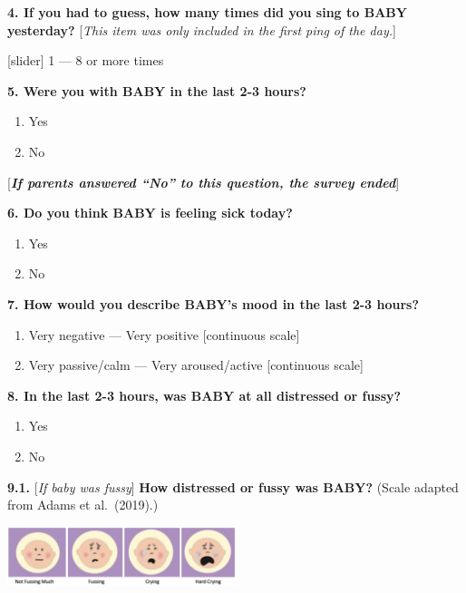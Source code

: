 \documentclass[
]{article}
\providecommand{\tightlist}{%
  \setlength{\itemsep}{0pt}\setlength{\parskip}{0pt}}
\begin{document}
\textbf{4. If you had to guess, how many times did you sing to BABY
yesterday?} {[}\emph{This item was only included in the first ping of
the day.}{]}

{[}slider{]} 1 --- 8 or more times

\textbf{5. Were you with BABY in the last 2-3 hours?}

\begin{enumerate}
\def\labelenumi{\alph{enumi}.}
\tightlist
\item
  Yes
\item
  No
\end{enumerate}

{[}\textbf{\emph{If parents answered ``No'' to this question, the survey
ended}}{]}

\textbf{6. Do you think BABY is feeling sick today?}

\begin{enumerate}
\def\labelenumi{\arabic{enumi}.}
\tightlist
\item
  Yes
\item
  No
\end{enumerate}

\textbf{7. How would you describe BABY's mood in the last 2-3 hours?}

\begin{enumerate}
\def\labelenumi{\alph{enumi}.}
\tightlist
\item
  Very negative --- Very positive {[}continuous scale{]}
\item
  Very passive/calm --- Very aroused/active {[}continuous scale{]}
\end{enumerate}

\textbf{8. In the last 2-3 hours, was BABY at all distressed or fussy?}

\begin{enumerate}
\def\labelenumi{\alph{enumi}.}
\tightlist
\item
  Yes
\item
  No
\end{enumerate}

\textbf{9.1.} {[}\emph{If baby was fussy}{]} \textbf{How distressed or
fussy was BABY?} (Scale adapted from Adams et al.~(2019).)

\includegraphics[width=0.5\textwidth,height=\textheight]{../viz/adams_scale.png}
\end{document}
